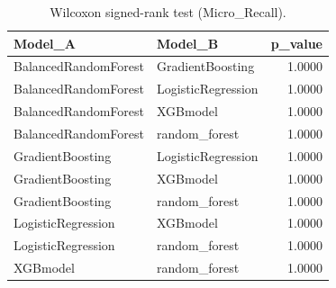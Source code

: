 \begin{table}[t]
\centering
\begin{tabular}{llr}
\toprule
Model_A & Model_B & p_value \\
\midrule
BalancedRandomForest & GradientBoosting & 1.0000 \\
BalancedRandomForest & LogisticRegression & 1.0000 \\
BalancedRandomForest & XGBmodel & 1.0000 \\
BalancedRandomForest & random_forest & 1.0000 \\
GradientBoosting & LogisticRegression & 1.0000 \\
GradientBoosting & XGBmodel & 1.0000 \\
GradientBoosting & random_forest & 1.0000 \\
LogisticRegression & XGBmodel & 1.0000 \\
LogisticRegression & random_forest & 1.0000 \\
XGBmodel & random_forest & 1.0000 \\
\bottomrule
\end{tabular}
\caption{Wilcoxon signed-rank test (Micro_Recall).}
\label{tab:wilcoxon_Micro_Recall}
\end{table}